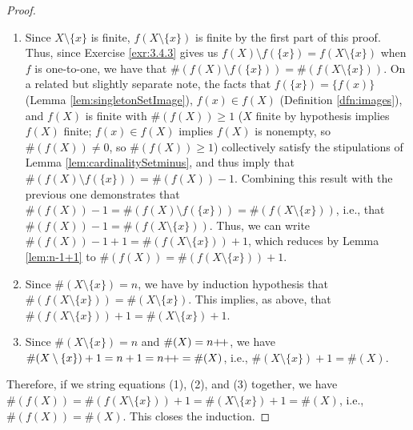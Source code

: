 \documentclass[../main.tex]{subfiles}
\begin{document}
\begin{enumerate}[ref={\thesection.\arabic*}]
\begin{prp}
\begin{enumerate}[label={\textup{(}\alph*\textup{)}},ref={\theenumi\alph*}]
\begin{proof}
                \begin{enumerate}[label={(\arabic*)}]
                    \item Since $X\setminus\{x\}$ is finite, $f(X\setminus\{x\})$ is finite by the first part of this proof. Thus, since Exercise \ref{exr:3.4.3} gives us $f(X)\setminus f(\{x\})=f(X\setminus\{x\})$ when $f$ is one-to-one, we have that $\#(f(X)\setminus f(\{x\}))=\#(f(X\setminus\{x\}))$. On a related but slightly separate note, the facts that $f(\{x\})=\{f(x)\}$ (Lemma \ref{lem:singletonSetImage}), $f(x)\in f(X)$ (Definition \ref{dfn:images}), and $f(X)$ is finite with $\#(f(X))\geq 1$ ($X$ finite by hypothesis implies $f(X)$ finite; $f(x)\in f(X)$ implies $f(X)$ is nonempty, so $\#(f(X))\neq 0$, so $\#(f(X))\geq 1$) collectively satisfy the stipulations of Lemma \ref{lem:cardinalitySetminus}, and thus imply that $\#(f(X)\setminus f(\{x\}))=\#(f(X))-1$. Combining this result with the previous one demonstrates that $\#(f(X))-1=\#(f(X)\setminus f(\{x\}))=\#(f(X\setminus\{x\}))$, i.e., that $\#(f(X))-1=\#(f(X\setminus\{x\}))$. Thus, we can write $\#(f(X))-1+1=\#(f(X\setminus\{x\}))+1$, which reduces by Lemma \ref{lem:n-1+1} to $\#(f(X))=\#(f(X\setminus\{x\}))+1$.
                    \item Since $\#(X\setminus\{x\})=n$, we have by induction hypothesis that $\#(f(X\setminus\{x\}))=\#(X\setminus\{x\})$. This implies, as above, that $\#(f(X\setminus\{x\}))+1=\#(X\setminus\{x\})+1$.
                    \item Since $\#(X\setminus\{x\})=n$ and $\#(X)=n{+\!+}$, we have $\#(X\setminus\{x\})+1=n+1=n{+\!+}=\#(X)$, i.e., $\#(X\setminus\{x\})+1=\#(X)$.
                \end{enumerate}
                Therefore, if we string equations (1), (2), and (3) together, we have $\#(f(X))=\#(f(X\setminus\{x\}))+1=\#(X\setminus\{x\})+1=\#(X)$, i.e., $\#(f(X))=\#(X)$. This closes the induction.
            \end{proof}
        \end{enumerate}
    \end{prp}
\end{enumerate}
\end{document}
